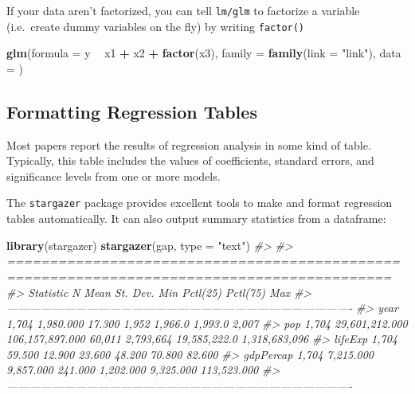 \documentclass[]{book}
\newenvironment{Shaded}{\begin{snugshade}}{\end{snugshade}}
\newcommand{\CommentTok}[1]{\textcolor[rgb]{0.56,0.35,0.01}{\textit{#1}}}
\newcommand{\DataTypeTok}[1]{\textcolor[rgb]{0.13,0.29,0.53}{#1}}
\newcommand{\KeywordTok}[1]{\textcolor[rgb]{0.13,0.29,0.53}{\textbf{#1}}}
\newcommand{\NormalTok}[1]{#1}
\newcommand{\OperatorTok}[1]{\textcolor[rgb]{0.81,0.36,0.00}{\textbf{#1}}}
\newcommand{\StringTok}[1]{\textcolor[rgb]{0.31,0.60,0.02}{#1}}
\begin{document}
If your data aren't factorized, you can tell \texttt{lm/glm} to factorize a variable (i.e.~create dummy variables on the fly) by writing \texttt{factor()}

\begin{Shaded}
\begin{Highlighting}[]
\KeywordTok{glm}\NormalTok{(}\DataTypeTok{formula =}\NormalTok{ y }\OperatorTok{~}\StringTok{ }\NormalTok{x1 }\OperatorTok{+}\StringTok{ }\NormalTok{x2 }\OperatorTok{+}\StringTok{ }\KeywordTok{factor}\NormalTok{(x3), }\DataTypeTok{family =} \KeywordTok{family}\NormalTok{(}\DataTypeTok{link =} \StringTok{"link"}\NormalTok{),}
            \DataTypeTok{data =}\NormalTok{ )}
\end{Highlighting}
\end{Shaded}

\hypertarget{formatting-regression-tables}{%
\subsection{Formatting Regression Tables}\label{formatting-regression-tables}}

Most papers report the results of regression analysis in some kind of table. Typically, this table includes the values of coefficients, standard errors, and significance levels from one or more models.

The \texttt{stargazer} package provides excellent tools to make and format regression tables automatically. It can also output summary statistics from a dataframe:

\begin{Shaded}
\begin{Highlighting}[]
\KeywordTok{library}\NormalTok{(stargazer)}
\KeywordTok{stargazer}\NormalTok{(gap, }\DataTypeTok{type =} \StringTok{"text"}\NormalTok{)}
\CommentTok{#> }
\CommentTok{#> ===========================================================================================}
\CommentTok{#> Statistic   N        Mean         St. Dev.       Min   Pctl(25)    Pctl(75)        Max     }
\CommentTok{#> -------------------------------------------------------------------------------------------}
\CommentTok{#> year      1,704   1,980.000        17.300       1,952   1,966.0    1,993.0        2,007    }
\CommentTok{#> pop       1,704 29,601,212.000 106,157,897.000 60,011  2,793,664 19,585,222.0 1,318,683,096}
\CommentTok{#> lifeExp   1,704     59.500         12.900      23.600   48.200      70.800       82.600    }
\CommentTok{#> gdpPercap 1,704   7,215.000       9,857.000    241.000 1,202.000  9,325.000    113,523.000 }
\CommentTok{#> -------------------------------------------------------------------------------------------}
\end{Highlighting}
\end{Shaded}
\end{document}
